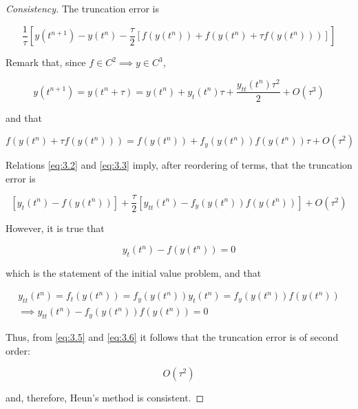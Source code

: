 \documentclass[a4paper]{amsproc}
\theoremstyle{plain}
\theoremstyle{definition}
\theoremstyle{remark}
\numberwithin{equation}{section}
\begin{document}
\begin{proof}[Consistency]

The truncation error is

\begin{equation}\label{eq:3.1}
 \frac{1}{\tau}[y(t^{n+1}) - y(t^{n}) - \frac{\tau}{2}[f(y(t^{n})) + f(y(t^{n}) + \tau f(y(t^{n})))]]
\end{equation}

Remark that, since $f \in C ^2 \implies y \in C^3$,

\begin{equation}\label{eq:3.2}
 y(t^{n+1}) = y(t^{n} + \tau) = y(t^{n}) + y_t(t^{n}) \tau + \frac{y_{tt}(t^n) \tau^2}{2} + O(\tau^3)
\end{equation}

and that

\begin{equation}\label{eq:3.3}
 f(y(t^{n}) + \tau f(y(t^{n}))) = f(y(t^{n})) + f_y(y(t^{n})) f(y(t^{n})) \tau + O(\tau^2)
\end{equation}

Relations \eqref{eq:3.2} and \eqref{eq:3.3} imply, after reordering of terms, that the truncation error is

\begin{equation}\label{eq:3.4}
 [y_t(t^{n}) - f(y(t^{n}))] + \frac{\tau}{2}[y_{tt}(t^n) - f_y(y(t^{n})) f(y(t^{n})) ] + O(\tau^2)
\end{equation}

However, it is true that

\begin{equation}\label{eq:3.5}
 y_t(t^{n}) - f(y(t^{n})) = 0
\end{equation}

which is the statement of the initial value problem, and that

\begin{multline}\label{eq:3.6}
 y_{tt}(t^{n}) = f_t(y(t^{n})) = f_y(y(t^{n})) y_t(t^{n}) = f_y(y(t^{n})) f(y(t^{n})) \\ \implies y_{tt}(t^n) - f_y(y(t^{n})) f(y(t^{n})) = 0
\end{multline}

Thus, from \eqref{eq:3.5} and \eqref{eq:3.6} it follows that the truncation error is of second order:

\begin{equation}\label{eq:3.7}
 O(\tau^2)
\end{equation}

and, therefore, Heun's method is consistent.

\end{proof}
\end{document}
